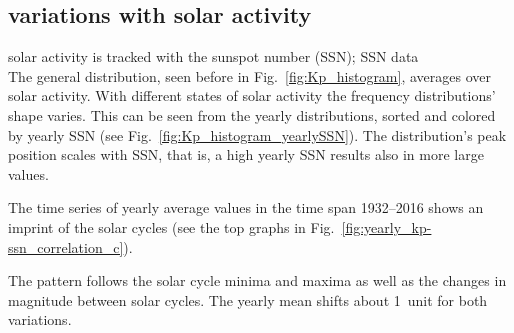 \subsection{\Kp{} variations with solar activity}
solar activity is tracked with the sunspot number (SSN); SSN data\\
The general \Kp{} distribution, seen before in Fig.~\ref{fig:Kp_histogram}, averages over solar activity. With different states of solar activity the \Kp{} frequency distributions' shape varies. This can be seen from the yearly distributions, sorted and colored by yearly SSN (see Fig.~\ref{fig:Kp_histogram_yearlySSN}). The distribution's peak position scales with SSN, that is, a high yearly SSN results also in more large \Kp{} values.\\
\begin{figure}
\end{figure}

The time series of yearly average \Kp{} values in the time span 1932--2016 shows an imprint of the solar cycles (see the top graphs in Fig.~\ref{fig:yearly_kp-ssn_correlation_c}).
\begin{figure}
\end{figure}
The \Kp{} pattern follows the solar cycle minima and maxima as well as the changes in magnitude between solar cycles. The yearly mean \Kp{} shifts about 1~unit for both variations.

